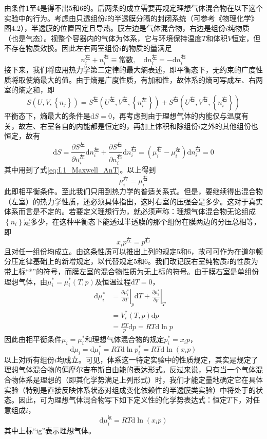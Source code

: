 \documentclass[main.tex]{subfiles}
\begin{document}
由条件1至4是得不出5和6的。后两条的成立需要再规定理想气体混合物在以下这个实验中的行为。考虑由只透组份$i$的半透膜分隔的封闭系统（可参考《物理化学》图4.2），半透膜的位置固定且导热。膜左边是气体混合物，右边是组份$i$纯物质（也是气态）。视整个容器内的气体为体系，它与环境保持温度$T$和体积$V$恒定，但不存在物质效换。因此左右两室组份$i$的物质的量满足
\[n_i^\text{左}+n_i^\text{右}\equiv\text{常数},\quad \mathrm{d}n_i^\text{左}=-\mathrm{d}n_i^\text{右}\]
接下来，我们将应用热力学第二定律的最大熵表述，即平衡态下，无约束的广度性质将取使熵最大的值。由于熵是广度性质，有加和性，故体系的熵可写成左、右两室的熵之和，即
\[S\left(U,V,\left\{n_j\right\}\right)=S^\text{左}\left(U^\text{左},V^\text{左},\left\{n_i^\text{左}\right\}\right)+S^\text{右}\left(U^\text{右},V^\text{右},\left\{n_i^\text{右}\right\}\right)\]
平衡态下，熵最大的条件是$\mathrm{d}S=0$，再考虑到由于理想气体的内能仅与温度有关，故左、右室各自的内能都是恒定的，再加上体积和除组份$i$之外的其他组份也恒定，故有
\[\mathrm{d}S=\frac{\partial S^\text{左}}{\partial n_i^\text{左}}\mathrm{d}n_i^\text{左}+\frac{\partial S^\text{右}}{\partial n_i^\text{右}}\mathrm{d}n_i^\text{右}=\left(\mu_i^\text{右}-\mu_i^\text{左}\right)\mathrm{d}n_i^\text{右}=0\]
其中用到了式\eqref{eq:I.1_Maxwell_AnT}。以上得到
\[\mu_i^\text{左}=\mu_i^\text{右}\]
此即相平衡条件。至此我们只用到热力学的普适关系式。但是，要继续得出混合物（左室）的热力学性质，还必须具体指出，这时右室的压强会是多少。这对于真实体系而言是不定的。若要定义理想行为，就必须声称：理想气体混合物无论组成$\left\{n_i\right\}$是多少，在这种平衡态下能透过半透膜的那个组份在膜两边的分压总相等，即
\[x_ip^\text{左}=p^\text{右}\]
且对任一组份均成立。由这条性质可以推出上列的规定5和6，故可可作为在道尔顿分压定律基础上的新增规定，以代替规定5和6。我们改记膜右室纯物质$i$的性质为带上标“*”的符号，而膜左室的混合物性质为无上标的符号。由于膜右室是单组份理想气体，由$\mu_i^*=\mu_i^*\left(T,p\right)$及恒温过程$\mathrm{d}T=0$，
\begin{align*}
    \mathrm{d}\mu_i^* & =\left.\frac{\partial \mu_i^*}{\partial T}\right|_{p}\mathrm{d}T+\left.\frac{\partial\mu_i^*}{\partial p}\right|_{T} \\
                      & =V_i^*\left(T,p\right)\mathrm{d}p                                                                                    \\
                      & =\frac{RT}{p}\mathrm{d}p=RT\mathrm{d}\ln p
\end{align*}
因此由相平衡条件$\mu_i=\mu_i^*$和理想气体混合物的规定$p_i^*=x_ip$，
\[\mathrm{d}\mu_i=\mathrm{d}\mu_i^*=RT\mathrm{d}\ln p_i^*=RT\mathrm{d}\ln\left(x_ip\right)\]
以上对所有组份$i$均成立。可见，体系这一特定实验中的性质规定，其实是规定了理想气体混合物的偏摩尔吉布斯自由能的表达形式。反过来说，只有当一个气体混合物体系是理想的（即其化学势满足上列形式）时，我们才能定量地确定它在具体实验（特别是直接反映体系状态对组成变化依赖性的半透膜类实验）中将处于的状态。因此，可为理想气体混合物写下如下定义性的化学势表达式：恒定$T$下，对任意组成$i$，
\begin{equation}\label{eq:II.3_def_ideal_gas_mixture_mu}
    \mathrm{d}\mu_i^\text{ig}=RT\mathrm{d}\ln\left(x_i p\right)
\end{equation}
其中上标“ig”表示理想气体。
\end{document}
